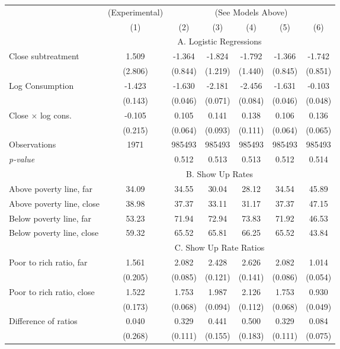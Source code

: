 \begin{tabular}{lcccccc}\toprule& (Experimental) & \multicolumn{5}{c}{(See Models Above)} \\ \cmidrule(lr){3-7} 
 & (1) & (2) & (3) & (4) & (5) & (6)\\\midrule
 & \multicolumn{6}{c}{\centering A. Logistic Regressions}\\\cmidrule(lr){2-7} 
Close subtreatment & 1.509 & -1.364 & -1.824 & -1.792 & -1.366 & -1.742 \\ & (2.806) & (0.844) & (1.219) & (1.440) & (0.845) & (0.851) \\Log Consumption & -1.423 & -1.630 & -2.181 & -2.456 & -1.631 & -0.103 \\ & (0.143) & (0.046) & (0.071) & (0.084) & (0.046) & (0.048) \\Close $\times$ log cons. & -0.105 & 0.105 & 0.141 & 0.138 & 0.106 & 0.136 \\ & (0.215) & (0.064) & (0.093) & (0.111) & (0.064) & (0.065) \\Observations & 1971 & 985493& 985493& 985493& 985493& 985493\\\textit{p-value} & & 0.512 & 0.513 & 0.513 & 0.512 & 0.514 \\\midrule
 & \multicolumn{6}{c}{\centering B. Show Up Rates}\\\cmidrule(lr){2-7} 
Above poverty line, far & 34.09 & 34.55 & 30.04 & 28.12 & 34.54 & 45.89 \\Above poverty line, close & 38.98 & 37.37 & 33.11 & 31.17 & 37.37 & 47.15 \\Below poverty line, far & 53.23 & 71.94 & 72.94 & 73.83 & 71.92 & 46.53 \\Below poverty line, close & 59.32 & 65.52 & 65.81 & 66.25 & 65.52 & 43.84 \\\midrule
 & \multicolumn{6}{c}{\centering C. Show Up Rate Ratios}\\\cmidrule(lr){2-7} 
Poor to rich ratio, far & 1.561 & 2.082 & 2.428 & 2.626 & 2.082 & 1.014 \\ & (0.205) & (0.085) & (0.121) & (0.141) & (0.086) & (0.054) \\Poor to rich ratio, close & 1.522 & 1.753 & 1.987 & 2.126 & 1.753 & 0.930 \\ & (0.173) & (0.068) & (0.094) & (0.112) & (0.068) & (0.049) \\Difference of ratios & 0.040 & 0.329 & 0.441 & 0.500 & 0.329 & 0.084 \\ & (0.268) & (0.111) & (0.155) & (0.183) & (0.111) & (0.075) \\\bottomrule\end{tabular}